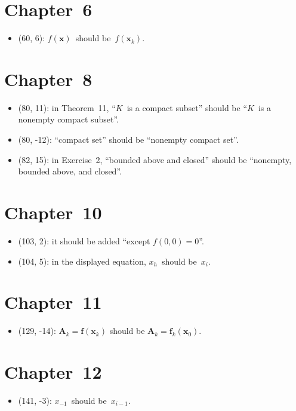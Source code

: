 \documentclass[letterpaper,12pt]{article}
\renewcommand{\vec}[1]{\boldsymbol{#1}}
\begin{document}
\section*{Chapter~6}
\begin{itemize}
\item (60, 6): \(f(\vec{x})\)~should be~\(f(\vec{x}_k)\).
\end{itemize}

\section*{Chapter~8}
\begin{itemize}
\item (80, 11): in Theorem~11, ``\(K\)~is a compact subset'' should be ``\(K\)~is a nonempty compact subset''.
\item (80, -12): ``compact set'' should be ``nonempty compact set''.
\item (82, 15): in Exercise~2, ``bounded above and closed'' should be ``nonempty, bounded above, and closed''.
\end{itemize}

\section*{Chapter~10}
\begin{itemize}
\item (103, 2): it should be added ``except \(f(0,0)=0\)''.
\item (104, 5): in the displayed equation, \(x_h\)~should be~\(x_i\).
\end{itemize}

\section*{Chapter~11}
\begin{itemize}
\item (129, -14): \(\vec{A}_k=\vec{f}(\vec{x}_k)\) should be \(\vec{A}_k=\vec{f}_{\!\!k}(\vec{x}_0)\).
\end{itemize}

\section*{Chapter~12}
\begin{itemize}
\item (141, -3): \(x_{-1}\)~should be~\(x_{i-1}\).
\end{itemize}
\end{document}
